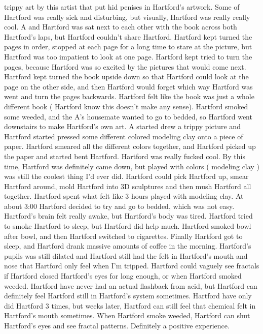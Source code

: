 \documentclass[12pt]{book}
\begin{document}
trippy art by this artist that put hid penises in Hartford's artwork. Some of Hartford was really sick and disturbing, but visually, Hartford was really really cool. A and Hartford was sat next to each other with the book across both Hartford's laps, but Hartford couldn't share Hartford. Hartford kept turned the pages in order, stopped at each page for a long time to stare at the picture, but Hartford was too impatient to look at one page. Hartford kept tried to turn the pages, because Hartford was so excited by the pictures that would come next. Hartford kept turned the book upside down so that Hartford could look at the page on the other side, and then Hartford would forget which way Hartford was went and turn the pages backwards. Hartford felt like the book was just a whole different book ( Hartford know this doesn't make any sense). Hartford smoked some weeded, and the A's housemate wanted to go to bedded, so Hartford went downstairs to make Hartford's own art. A started drew a trippy picture and Hartford started pressed some different colored modeling clay onto a piece of paper. Hartford smeared all the different colors together, and Hartford picked up the paper and started bent Hartford. Hartford was really fucked cool. By this time, Hartford was definitely came down, but played with colors ( modeling clay ) was still the coolest thing I'd ever did. Hartford could pick Hartford up, smear Hartford around, mold Hartford into 3D sculptures and then mush Hartford all together. Hartford spent what felt like 3 hours played with modeling clay. At about 3:00 Hartford decided to try and go to bedded, which was not easy. Hartford's brain felt really awake, but Hartford's body was tired. Hartford tried to smoke Hartford to sleep, but Hartford did help much. Hartford smoked bowl after bowl, and then Hartford switched to cigarettes. Finally Hartford got to sleep, and Hartford drank massive amounts of coffee in the morning. Hartford's pupils was still dilated and Hartford still had the felt in Hartford's mouth and nose that Hartford only feel when I'm tripped. Hartford could vaguely see fractals if Hartford closed Hartford's eyes for long enough, or when Hartford smoked weeded. Hartford have never had an actual flashback from acid, but Hartford can definitely feel Hartford still in Hartford's system sometimes. Hartford have only did Hartford 3 times, but weeks later, Hartford can still feel that chemical felt in Hartford's mouth sometimes. When Hartford smoke weeded, Hartford can shut Hartford's eyes and see fractal patterns. Definitely a positive experience.
\end{document}
